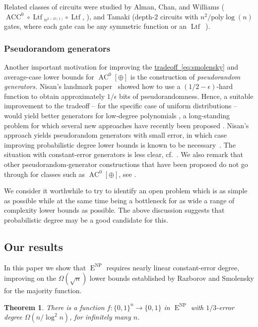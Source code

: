 \documentclass[11pt]{article}
\newcommand{\expeqref}[2]{\texorpdfstring{\hyperref[#2]{#1~\eqref{#2}}}{#1~\eqref{#2}}}
\newtheorem{thm}[theorem]{Theorem}
\DeclareMathOperator{\Ltf}{\mathrm{Ltf}}  %
\DeclareMathOperator{\AC}{\mathrm{AC}}  %
\DeclareMathOperator{\ACC}{\mathrm{ACC}}  %
\DeclareMathOperator{\NP}{\mathrm{NP}}  %
\DeclareMathOperator{\EEE}{\mathrm{E}}  %
\newcommand{\zo}{\{0, 1\}}
\newcommand{\poly}{\mathrm{poly}}
\newcommand{\e}{\epsilon}
\begin{document}
Related classes of circuits were studied by Alman, Chan, and Williams
($\ACC^{0}\circ \Ltf{}_{n^{2-\Omega(1)}}\circ \Ltf$,
%
\cite[Corollary 1.1]{AlmanCW16}),   %
and Tamaki (depth-2 circuits with $n^{2}/\poly\log(n)$
gates, where each gate can be any symmetric function or an $\Ltf$~\cite{Tamaki16}).

\subsubsection{Pseudorandom generators}

Another important motivation for improving the \expeqref{tradeoff}{eq:smolensky}
and average-case lower bounds for $\AC^{0}[\oplus]$ is the construction
of \emph{pseudorandom generators.} Nisan's landmark paper~\cite{Nis91}
showed how to use a $(1/2-\e)$-hard function to obtain approximately
$1/\e$ bits of pseudorandomness. Hence, a suitable improvement to
the tradeoff -- for the specific case of uniform distributions --
would yield better generators for low-degree polynomials \cite{BoV-gen,Lov09,Viola-d},
a long-standing problem for which several new approaches have recently
been proposed \cite{DBLP:conf/coco/ChattopadhyayHH18,DBLP:conf/innovations/ChattopadhyayHL19,DBLP:journals/corr/abs-2008-01316,Viola-L12requiresCor}.
Nisan's approach yields pseudorandom generators with small error,
in which case improving probabilistic degree lower bounds is known
to be necessary~\cite{Viola-d}. The situation with constant-error
generators is less clear, cf.~\cite{viola-PRG-requires-MAJ}. We
also remark that other pseudorandom-generator constructions that have
been proposed do not go through for classes such as $\AC^{0}[\oplus]$,
see \cite{ShV-dec,GrinbergSV-adaptivemajority,viola-PRG-requires-MAJ}.

\medskip

We consider it worthwhile to try to identify an open problem which
is as simple as possible while at the same time being a bottleneck
for as wide a range of complexity lower bounds as possible. The above
discussion suggests that probabilistic degree may be a good candidate
for this.

\subsection{Our results}

In this %
paper  %
we show that $\EEE^{\NP}$ requires %
nearly linear %
constant-error
degree, improving on the $\Omega(\sqrt{n})$ lower bounds established
by Razborov and Smolensky \cite{Raz87,Smo87,Smolensky93} for the
majority function.
\begin{thm}
\label{thm:prob-degree-lower-bound}There is a function $f:\zo^{n}\to\zo$
in $\EEE^{\NP}$ with $1/3$-error degree $\Omega(n/\log^{2}n)$, for
infinitely many $n$.
\end{thm}
\end{document}
